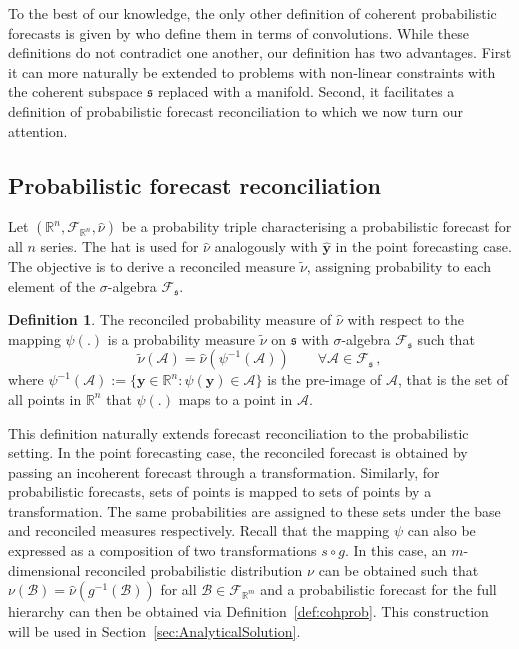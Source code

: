 \documentclass[11pt]{article}
\theoremstyle{definition}
\newtheorem{definition}{Definition}[section]
\begin{document}
To the best of our knowledge, the only other definition of coherent probabilistic forecasts is given by \cite{Taieb2017} who define them in terms of convolutions. While these definitions do not contradict one another, our definition has two advantages. First it can more naturally be extended to problems with non-linear constraints with the coherent subspace $\mathfrak{s}$ replaced with a manifold. Second, it facilitates a definition of probabilistic forecast reconciliation to which we now turn our attention.

\subsection{Probabilistic forecast reconciliation}

Let $(\mathbb{R}^n, \mathscr{F}_{\mathbb{R}^n}, \hat{\nu})$ be a probability triple characterising a probabilistic forecast for all $n$ series. The hat is used for $\hat{\nu}$ analogously with $\hat{\bm{y}}$ in the point forecasting case. The objective is to derive a reconciled measure $\tilde{\nu}$, assigning probability to each element of the $\sigma$-algebra $\mathscr{F}_\mathfrak{s}$.

\begin{definition} \label{def:reconprob}
	The reconciled probability measure of $\hat{\nu}$ with respect to the mapping $\psi(.)$ is a probability measure $\tilde{\nu}$ on $\mathfrak{s}$ with $\sigma$-algebra $\mathscr{F}_\mathfrak{s}$ such that
	\[
	\tilde{\nu}(\mathcal{A}) = \hat{\nu}(\psi^{-1}(\mathcal{A})) \qquad \forall \mathcal{A} \in \mathscr{F}_{\mathfrak{s}}\,,
	\]
	where $\psi^{-1}(\mathcal{A}):=\{{\bm{y}}\in \mathbb{R}^n:\psi({\bm{y}})\in \mathcal{A}\}$ is the pre-image of $\mathcal{A}$, that is the set of all points in $\mathbb{R}^n$ that $\psi(.)$ maps to a point in $\mathcal{A}$.
\end{definition}

This definition naturally extends forecast reconciliation to the probabilistic setting. In the point forecasting case, the reconciled forecast is obtained by passing an incoherent forecast through a transformation. Similarly, for probabilistic forecasts, sets of points is mapped to sets of points by a transformation. The same probabilities are assigned to these sets under the base and reconciled measures respectively. Recall that the mapping $\psi$ can also be expressed as a composition of two transformations $s\circ g$. In this case, an $m$-dimensional reconciled probabilistic distribution $\nu$ can be obtained such that $\nu(\mathcal{B})= \hat{\nu}(g^{-1}(\mathcal{B}))$ for all $\mathcal{B} \in \mathscr{F}_{\mathbb{R}^m}$ and a probabilistic forecast for the full hierarchy can then be obtained via Definition~\ref{def:cohprob}. This construction will be used in Section~\ref{sec:AnalyticalSolution}.
\end{document}

